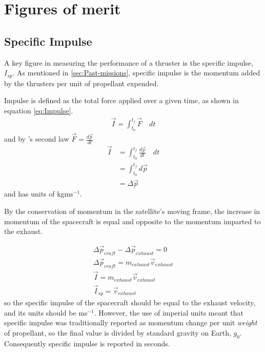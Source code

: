 \section{Figures of merit}
\subsection{Specific Impulse} \label{sub:Isp}

A key figure in measuring the performance of a thruster is the specific impulse, $I_{sp}$. As mentioned in \autoref{sec:Past-missions}, specific impulse is the momentum added by the thrusters per unit of propellant expended.

Impulse is defined as the total force applied over a given time, as shown in equation \eqref{eq:Impulse}.
\begin{gather} \label{eq:Impulse}
\vec{I} = \int_{t_0}^{t_f}\vec{F}\quad dt
\end{gather}
and by \textcite{Newton1687}'s second law $\vec{F} = \frac{d\vec{p}}{dt}$
\begin{align}
\vec{I} &= \int_{t_0}^{t_f}\frac{d\vec{p}}{dt}\quad dt \\
&= \int_{t_0}^{t_f}d\vec{p} \\
&= \Delta\vec{p}
\end{align}
and has units of kgms$^{-1}$. 

By the conservation of momentum in the satellite's moving frame, the increase in momentum of the spacecraft is equal and opposite to the momentum imparted to the exhaust.

\begin{gather}
\Delta\vec{p}_{craft} - \Delta\vec{p}_{exhaust} = 0 \\
\Delta\vec{p}_{craft} = m_{exhaust}\vec{v}_{exhaust} \\
\vec{I} = m_{exhaust}\vec{v}_{exhaust} \\
\vec{I}_{sp} = \vec{v}_{exhaust}
\end{gather}
so the specific impulse of the spacecraft should be equal to the exhaust velocity, and its units should be ms$^{-1}$. However, the use of imperial units meant that specific impulse was traditionally reported as momentum change per unit {\em weight} of propellant, so the final value is divided by standard gravity on Earth, $g_0$. Consequently specific impulse is reported in seconds.

